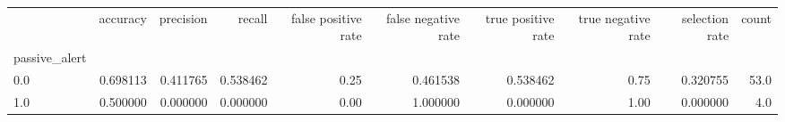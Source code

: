 \begin{tabular}{lrrrrrrrrr}
\toprule
{} &  accuracy &  precision &    recall &  false positive rate &  false negative rate &  true positive rate &  true negative rate &  selection rate &  count \\
passive\_alert &           &            &           &                      &                      &                     &                     &                 &        \\
\midrule
0.0           &  0.698113 &   0.411765 &  0.538462 &                 0.25 &             0.461538 &            0.538462 &                0.75 &        0.320755 &   53.0 \\
1.0           &  0.500000 &   0.000000 &  0.000000 &                 0.00 &             1.000000 &            0.000000 &                1.00 &        0.000000 &    4.0 \\
\bottomrule
\end{tabular}
